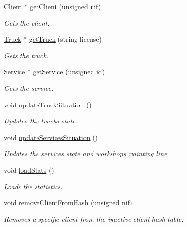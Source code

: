 \begin{DoxyCompactItemize}
\hyperlink{class_client}{Client} $\ast$ \hyperlink{class_company_ae8efdaf521467fd204c8d272f4469679}{get\+Client} (unsigned nif)
\begin{DoxyCompactList}\small\item\em Gets the client. \end{DoxyCompactList}\item 
\hyperlink{class_truck}{Truck} $\ast$ \hyperlink{class_company_acb9c7285e4ca619899017bd1221a1d27}{get\+Truck} (string license)
\begin{DoxyCompactList}\small\item\em Gets the truck. \end{DoxyCompactList}\item 
\hyperlink{class_service}{Service} $\ast$ \hyperlink{class_company_acf80072e8abec3e359387243d8cdc49f}{get\+Service} (unsigned id)
\begin{DoxyCompactList}\small\item\em Gets the service. \end{DoxyCompactList}\item 
void \hyperlink{class_company_af058ee612ca75f1bbd6507e078e5de0a}{update\+Truck\+Situation} ()
\begin{DoxyCompactList}\small\item\em Updates the truck\textquotesingle{}s state. \end{DoxyCompactList}\item 
void \hyperlink{class_company_ae5ce2e4c8d26951b71ca73c7589f6875}{update\+Services\+Situation} ()
\begin{DoxyCompactList}\small\item\em Updates the services\textquotesingle{} state and workshops\textquotesingle{} wainting line. \end{DoxyCompactList}\item 
void \hyperlink{class_company_a1e471fb69b7924e03cfdc01c3692f26c}{load\+Stats} ()
\begin{DoxyCompactList}\small\item\em Loads the statistics. \end{DoxyCompactList}\item 
void \hyperlink{class_company_a3bf95c042bb55a3096871ac861f58f8f}{remove\+Client\+From\+Hash} (unsigned nif)
\begin{DoxyCompactList}\small\item\em Removes a specific client from the inactive client hash table. \end{DoxyCompactList}\item 

\end{DoxyCompactItemize}
